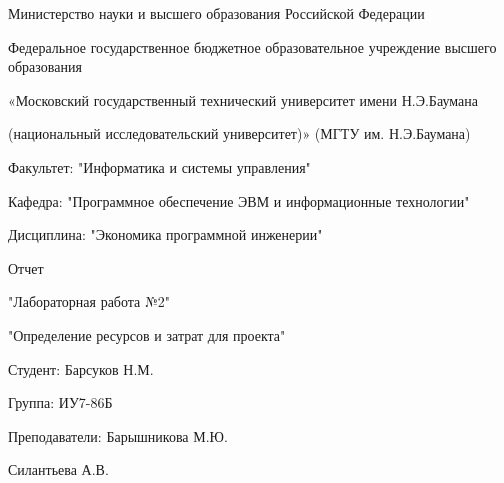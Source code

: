 \begin{center}
	Министерство науки и высшего образования Российской Федерации
	
	
	Федеральное государственное бюджетное образовательное учреждение высшего образования
	
	
	«Московский государственный технический университет имени Н.Э.Баумана
	
	
	(национальный исследовательский университет)» (МГТУ им. Н.Э.Баумана)
\end{center}

\vspace{8ex}

\begin{flushleft}
	Факультет: "Информатика и системы управления"
	
	Кафедра: "Программное обеспечение ЭВМ и информационные технологии"
	
	Дисциплина: "Экономика программной инженерии"
\end{flushleft}
\vspace{5ex}
\begin{center}
	Отчет
	
	"Лабораторная работа №2"
	
	"Определение ресурсов и затрат для проекта"
\end{center}

\vspace{5ex}

\begin{flushright}
	Студент: Барсуков Н.М.
	
	Группа: ИУ7-86Б
	
	Преподаватели: Барышникова М.Ю. 
	
	Силантьева А.В.
\end{flushright}